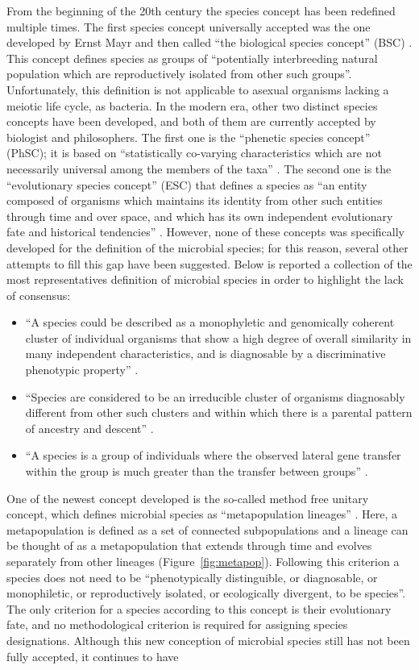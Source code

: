 From the beginning of the 20th century the species concept has been redefined multiple times. The first species concept universally accepted was the one developed by Ernst Mayr and then called ``the biological species concept'' (BSC) \cite{mayr1942systematics}. This concept defines species as groups of ``potentially interbreeding natural population which are reproductively isolated from other such groups''. Unfortunately, this definition is not applicable to asexual organisms lacking a meiotic life cycle, as bacteria. In the modern era, other two distinct species concepts have been developed, and both of them are currently accepted by biologist and philosophers. The first one is the ``phenetic species concept'' (PhSC); it is based on ``statistically co-varying characteristics which are not necessarily universal among the members of the taxa'' \cite{claridge1997species, sokal1970biological}. The second one is the ``evolutionary species concept'' (ESC) that defines a species as ``an entity composed of organisms which maintains its identity from other such entities through time and over space, and which has its own independent evolutionary fate and historical tendencies'' \cite{claridge1997species}. However, none of these concepts was specifically developed for the definition of the microbial species; for this reason, several other attempts to fill this gap have been suggested. Below is reported a collection of the most representatives definition of microbial species in order to highlight the lack of consensus:
\begin{itemize}
\item ``A species could be described as a monophyletic and genomically coherent cluster of individual organisms that show a high degree of overall similarity in many independent characteristics, and is diagnosable by a discriminative phenotypic property'' \cite{rossello2001species}.
\item ``Species are considered to be an irreducible cluster of organisms diagnosably different from other such clusters and within which there is a parental pattern of ancestry and descent'' \cite{staley2006bacterial}.
\item ``A species is a group of individuals where the observed lateral gene transfer within the group is much greater than the transfer between groups'' \cite{dykhuizen2005species}.
\end{itemize}
One of the newest concept developed is the so-called method free unitary concept, which defines microbial species as ``metapopulation lineages'' \cite{de2005ernst}. Here, a metapopulation is defined as a set of connected subpopulations and a lineage can be thought of as a metapopulation that extends through time and evolves separately from other lineages (Figure~\ref{fig:metapop}). Following this criterion a species does not need to be ``phenotypically distinguible, or diagnosable, or monophiletic, or reproductively isolated, or ecologically divergent, to be species''. The only criterion for a species according to this concept is their evolutionary fate, and no methodological criterion is required for assigning species designations. Although this new conception of microbial species still has not been fully accepted, it continues to have
